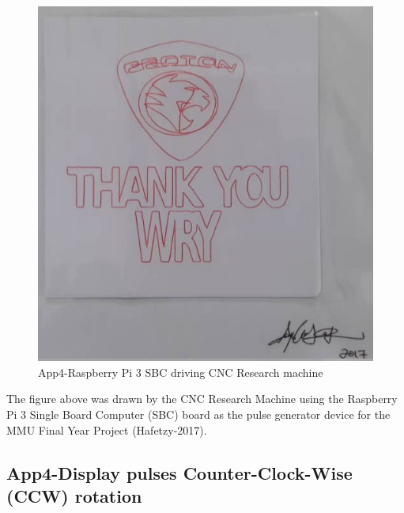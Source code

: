 \begin{figure}[htbp]
	\begin{center}
		\includegraphics[width=1.00\textwidth]{./07-images/img-Ch4App/Success-drawing-Proton.jpg}
		\caption{App4-Raspberry Pi 3 SBC driving CNC Research machine}
		\label{fig:App4-Hafetzy - Raspberry Pi 3 SBC driving CNC Research machine}
	\end{center}
\end{figure}
The figure above was drawn by the CNC Research Machine using the Raspberry Pi 3 Single Board Computer (SBC) board as the pulse generator device for the MMU Final Year Project (Hafetzy-2017).

\pagebreak
\subsection{App4-Display pulses Counter-Clock-Wise (CCW) rotation}

